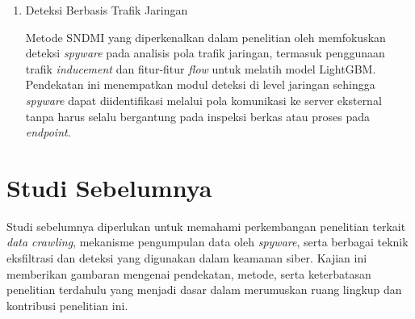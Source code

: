 \begin{enumerate}
    \item Deteksi Berbasis Trafik Jaringan

    Metode SNDMI yang diperkenalkan dalam penelitian oleh \textcite{peng2024sndmi} 
    memfokuskan deteksi \textit{spyware} pada analisis pola trafik jaringan, 
    termasuk penggunaan trafik \textit{inducement} dan fitur-fitur 
    \textit{flow} untuk melatih model LightGBM. Pendekatan ini menempatkan 
    modul deteksi di level jaringan sehingga \textit{spyware} dapat 
    diidentifikasi melalui pola komunikasi ke server eksternal tanpa harus 
    selalu bergantung pada inspeksi berkas atau proses pada \textit{endpoint}.

\end{enumerate}

\section{Studi Sebelumnya}

Studi sebelumnya diperlukan untuk memahami perkembangan penelitian 
terkait \textit{data crawling}, mekanisme pengumpulan data oleh 
\textit{spyware}, serta berbagai teknik eksfiltrasi dan deteksi yang 
digunakan dalam keamanan siber. Kajian ini memberikan gambaran mengenai 
pendekatan, metode, serta keterbatasan penelitian terdahulu yang menjadi 
dasar dalam merumuskan ruang lingkup dan kontribusi penelitian ini.

